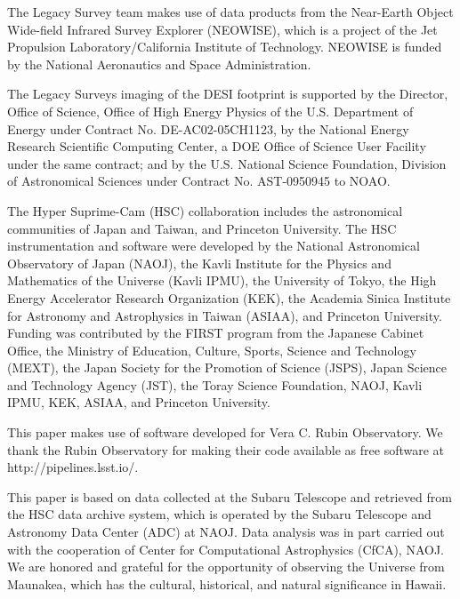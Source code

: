 \documentclass[letter]{aa}
\begin{document}
\begin{acknowledgements}
The Legacy Survey team makes use of data products from the Near-Earth Object Wide-field Infrared Survey Explorer (NEOWISE), which is a project of the Jet Propulsion Laboratory/California Institute of Technology. NEOWISE is funded by the National Aeronautics and Space Administration.

The Legacy Surveys imaging of the DESI footprint is supported by the Director, Office of Science, Office of High Energy Physics of the U.S. Department of Energy under Contract No. DE-AC02-05CH1123, by the National Energy Research Scientific Computing Center, a DOE Office of Science User Facility under the same contract; and by the U.S. National Science Foundation, Division of Astronomical Sciences under Contract No. AST-0950945 to NOAO.

The Hyper Suprime-Cam (HSC) collaboration includes the astronomical communities of Japan and Taiwan, and Princeton University. The HSC instrumentation and software were developed by the National Astronomical Observatory of Japan (NAOJ), the Kavli Institute for the Physics and Mathematics of the Universe (Kavli IPMU), the University of Tokyo, the High Energy Accelerator Research Organization (KEK), the Academia Sinica Institute for Astronomy and Astrophysics in Taiwan (ASIAA), and Princeton University. Funding was contributed by the FIRST program from the Japanese Cabinet Office, the Ministry of Education, Culture, Sports, Science and Technology (MEXT), the Japan Society for the Promotion of Science (JSPS), Japan Science and Technology Agency (JST), the Toray Science Foundation, NAOJ, Kavli IPMU, KEK, ASIAA, and Princeton University.

This paper makes use of software developed for Vera C. Rubin Observatory. We thank the Rubin Observatory for making their code available as free software at http://pipelines.lsst.io/.

This paper is based on data collected at the Subaru Telescope and retrieved from the HSC data archive system, which is operated by the Subaru Telescope and Astronomy Data Center (ADC) at NAOJ. Data analysis was in part carried out with the cooperation of Center for Computational Astrophysics (CfCA), NAOJ. We are honored and grateful for the opportunity of observing the Universe from Maunakea, which has the cultural, historical, and natural significance in Hawaii.

\end{acknowledgements}








\end{document}
